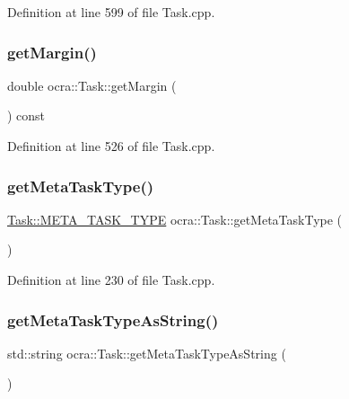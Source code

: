 Definition at line 599 of file Task.\+cpp.

\hypertarget{classocra_1_1Task_ae12d06cba3048edf3fc2ba86f61e23b6}{}\label{classocra_1_1Task_ae12d06cba3048edf3fc2ba86f61e23b6} 
\subsubsection{\texorpdfstring{get\+Margin()}{getMargin()}}
{\footnotesize\ttfamily double ocra\+::\+Task\+::get\+Margin (\begin{DoxyParamCaption}{ }\end{DoxyParamCaption}) const}



Definition at line 526 of file Task.\+cpp.

\hypertarget{classocra_1_1Task_a89d970771d25b28149d51768f37118d5}{}\label{classocra_1_1Task_a89d970771d25b28149d51768f37118d5} 
\subsubsection{\texorpdfstring{get\+Meta\+Task\+Type()}{getMetaTaskType()}}
{\footnotesize\ttfamily \hyperlink{classocra_1_1Task_a8ddf2840d178ca273e886c9ca95248fe}{Task\+::\+M\+E\+T\+A\+\_\+\+T\+A\+S\+K\+\_\+\+T\+Y\+PE} ocra\+::\+Task\+::get\+Meta\+Task\+Type (\begin{DoxyParamCaption}{ }\end{DoxyParamCaption})}



Definition at line 230 of file Task.\+cpp.

\hypertarget{classocra_1_1Task_a957707b86aa3fdc088040485ab9269ed}{}\label{classocra_1_1Task_a957707b86aa3fdc088040485ab9269ed} 
\subsubsection{\texorpdfstring{get\+Meta\+Task\+Type\+As\+String()}{getMetaTaskTypeAsString()}}
{\footnotesize\ttfamily std\+::string ocra\+::\+Task\+::get\+Meta\+Task\+Type\+As\+String (\begin{DoxyParamCaption}{ }\end{DoxyParamCaption})}



